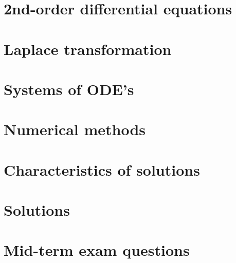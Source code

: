 \documentclass[a4paper]{book} %
\begin{document}
\chapter{2nd-order differential equations}

\chapter{Laplace transformation}

\chapter{Systems of ODE's}

\chapter{Numerical methods}

\chapter{Characteristics of solutions}

\appendix
%
\chapter{Solutions}

\chapter{Mid-term exam questions}


\end{document}
